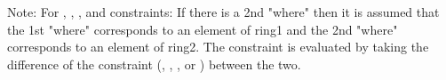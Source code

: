 Note: For , , , and
 constraints: If there is a 2nd "where" then it is
assumed that the 1st "where" corresponds to an element of ring1 and
the 2nd "where" corresponds to an element of ring2.  The constraint is
evaluated by taking the difference of the constraint (,
, , or ) between the two.
